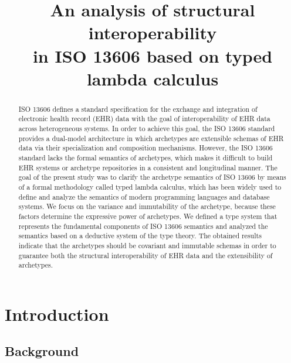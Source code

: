 \documentclass[preprint,3p,onecolumn,times,review]{article}
\title{An analysis of structural interoperability \\in {ISO 13606} based on typed lambda calculus}
\begin{document}
\maketitle


\begin{abstract}
  ISO 13606 defines a standard specification for the exchange and integration of electronic health record (EHR) data with the goal of interoperability of EHR data across heterogeneous systems.
  In order to achieve this goal, the ISO 13606 standard provides a dual-model architecture in which archetypes are extensible schemas of EHR data via their specialization and composition mechanisms.
  However, the ISO 13606 standard lacks the formal semantics of archetypes, which makes it difficult to build EHR systems or archetype repositories in a consistent and longitudinal manner.
  The goal of the present study was to clarify the archetype semantics of ISO 13606 by means of a formal methodology called typed lambda calculus, which has been widely used to define and analyze the semantics of modern programming languages and database systems.
  We focus on the variance and immutability of the archetype, because these factors determine the expressive power of archetypes.
  We defined a type system that represents the fundamental components of ISO 13606 semantics and analyzed the semantics based on a deductive system of the type theory.
  The obtained results indicate that the archetypes should be covariant and immutable schemas in order to guarantee both the structural interoperability of EHR data and the extensibility of archetypes.
\end{abstract}






\section{Introduction}

\subsection{Background}
\end{document}
